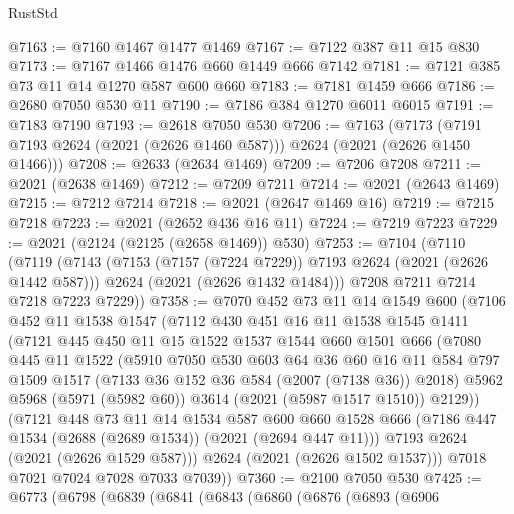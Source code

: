 \begin{lexlean}{RustStd}
\begin{coremodule}
@7163 := @7160 @1467 @1477 @1469
@7167 := @7122 @387 @11 @15 @830
@7173 := @7167 @1466 @1476 @660 @1449 @666 @7142
@7181 := @7121 @385 @73 @11 @14 @1270 @587 @600 @660
@7183 := @7181 @1459 @666
@7186 := @2680 @7050 @530 @11
@7190 := @7186 @384 @1270 @6011 @6015
@7191 := @7183 @7190
@7193 := @2618 @7050 @530
@7206 := @7163
    (@7173 (@7191 @7193 @2624 (@2021 (@2626 @1460 @587))) @2624 (@2021 (@2626 @1450 @1466)))
@7208 := @2633 (@2634 @1469)
@7209 := @7206 @7208
@7211 := @2021 (@2638 @1469)
@7212 := @7209 @7211
@7214 := @2021 (@2643 @1469)
@7215 := @7212 @7214
@7218 := @2021 (@2647 @1469 @16)
@7219 := @7215 @7218
@7223 := @2021 (@2652 @436 @16 @11)
@7224 := @7219 @7223
@7229 := @2021 (@2124 (@2125 (@2658 @1469)) @530)
@7253 := @7104
    (@7110
      (@7119
        (@7143
          (@7153 (@7157 (@7224 @7229)) @7193 @2624 (@2021 (@2626 @1442 @587)))
          @2624
          (@2021 (@2626 @1432 @1484)))
        @7208
        @7211
        @7214
        @7218
        @7223
        @7229))
@7358 := @7070
    @452
    @73
    @11
    @14
    @1549
    @600
    (@7106
      @452
      @11
      @1538
      @1547
      (@7112
        @430
        @451
        @16
        @11
        @1538
        @1545
        @1411
        (@7121
          @445
          @450
          @11
          @15
          @1522
          @1537
          @1544
          @660
          @1501
          @666
          (@7080
            @445
            @11
            @1522
            (@5910
              @7050
              @530
              @603
              @64
              @36
              @60
              @16
              @11
              @584
              @797
              @1509
              @1517
              (@7133 @36 @152 @36 @584 (@2007 (@7138 @36)) @2018)
              @5962
              @5968
              (@5971 (@5982 @60))
              @3614
              (@2021 (@5987 @1517 @1510))
              @2129))
          (@7121
            @448
            @73
            @11
            @14
            @1534
            @587
            @600
            @660
            @1528
            @666
            (@7186 @447 @1534 (@2688 (@2689 @1534)) (@2021 (@2694 @447 @11)))
            @7193
            @2624
            (@2021 (@2626 @1529 @587)))
          @2624
          (@2021 (@2626 @1502 @1537)))
        @7018
        @7021
        @7024
        @7028
        @7033
        @7039))
@7360 := @2100 @7050 @530
@7425 := @6773
    (@6798
      (@6839
        (@6841
          (@6843
            (@6860
              (@6876
                (@6893
                  (@6906

\end{coremodule}
\end{lexlean}
